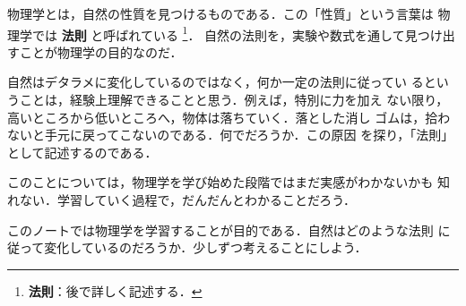             物理学とは，自然の性質を見つけるものである．この「性質」という言葉は
            物理学では \textbf{法則} と呼ばれている
                \footnote{
                    \textbf{法則}：後で詳しく記述する．
                }．
            自然の法則を，実験や数式を通して見つけ出すことが物理学の目的なのだ．

            自然はデタラメに変化しているのではなく，何か一定の法則に従ってい
            るということは，経験上理解できることと思う．例えば，特別に力を加え
            ない限り，高いところから低いところへ，物体は落ちていく．落とした消し
            ゴムは，拾わないと手元に戻ってこないのである．何でだろうか．この原因
            を探り，「法則」として記述するのである．

            このことについては，物理学を学び始めた段階ではまだ実感がわかないかも
            知れない．学習していく過程で，だんだんとわかることだろう．

            このノートでは物理学を学習することが目的である．自然はどのような法則
            に従って変化しているのだろうか．少しずつ考えることにしよう．


